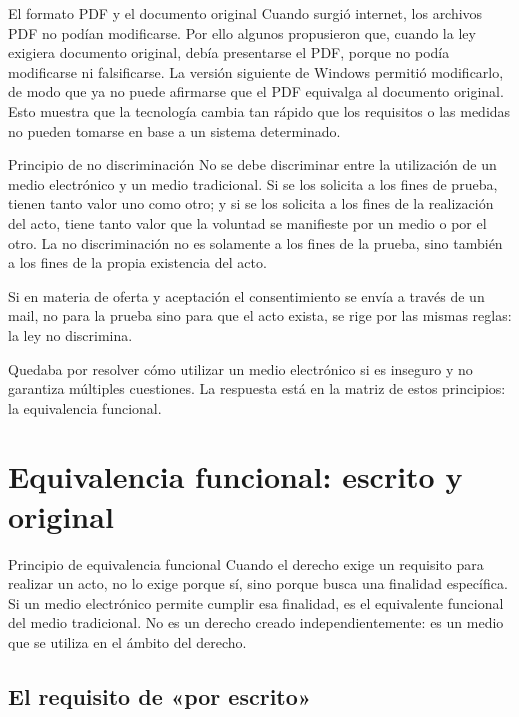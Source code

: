 \documentclass[12pt,oneside]{book}
\begin{document}
\begin{example}{El formato PDF y el documento original}
Cuando surgió internet, los archivos PDF no podían modificarse. Por ello algunos propusieron que, cuando la ley exigiera documento original, debía presentarse el PDF, porque no podía modificarse ni falsificarse. La versión siguiente de Windows permitió modificarlo, de modo que ya no puede afirmarse que el PDF equivalga al documento original. Esto muestra que la tecnología cambia tan rápido que los requisitos o las medidas no pueden tomarse en base a un sistema determinado.
\end{example}

\begin{definition}{Principio de no discriminación}
No se debe discriminar entre la utilización de un medio electrónico y un medio tradicional. Si se los solicita a los fines de prueba, tienen tanto valor uno como otro; y si se los solicita a los fines de la realización del acto, tiene tanto valor que la voluntad se manifieste por un medio o por el otro. La no discriminación no es solamente a los fines de la prueba, sino también a los fines de la propia existencia del acto.
\end{definition}

Si en materia de oferta y aceptación el consentimiento se envía a través de un mail, no para la prueba sino para que el acto exista, se rige por las mismas reglas: la ley no discrimina.

Quedaba por resolver cómo utilizar un medio electrónico si es inseguro y no garantiza múltiples cuestiones. La respuesta está en la matriz de estos principios: la equivalencia funcional.

\section{Equivalencia funcional: escrito y original}

\begin{definition}{Principio de equivalencia funcional}
Cuando el derecho exige un requisito para realizar un acto, no lo exige porque sí, sino porque busca una finalidad específica. Si un medio electrónico permite cumplir esa finalidad, es el equivalente funcional del medio tradicional. No es un derecho creado independientemente: es un medio que se utiliza en el ámbito del derecho.
\end{definition}

\subsection{El requisito de «por escrito»}
\end{document}
